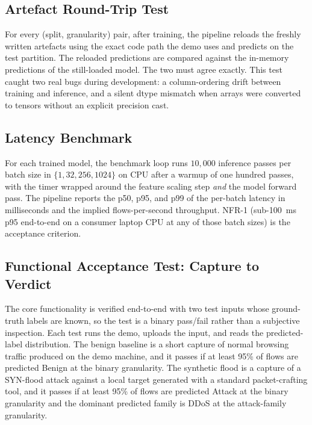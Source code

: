\subsection{Artefact Round-Trip Test}
\label{subsec:roundtrip_test}

\par For every (split, granularity) pair, after training, the pipeline reloads the freshly written artefacts using the exact code path the demo uses and predicts on the test partition. The reloaded predictions are compared against the in-memory predictions of the still-loaded model. The two must agree exactly. This test caught two real bugs during development: a column-ordering drift between training and inference, and a silent dtype mismatch when arrays were converted to tensors without an explicit precision cast.

\subsection{Latency Benchmark}
\label{subsec:latency_benchmark}

\par For each trained model, the benchmark loop runs $10{,}000$ inference passes per batch size in $\{1, 32, 256, 1024\}$ on CPU after a warmup of one hundred passes, with the timer wrapped around the feature scaling step \emph{and} the model forward pass. The pipeline reports the p50, p95, and p99 of the per-batch latency in milliseconds and the implied flows-per-second throughput. NFR-1 (sub-100~ms p95 end-to-end on a consumer laptop CPU at any of those batch sizes) is the acceptance criterion.

\subsection{Functional Acceptance Test: Capture to Verdict}
\label{subsec:f1_functional_test}

\par The core functionality is verified end-to-end with two test inputs whose ground-truth labels are known, so the test is a binary pass/fail rather than a subjective inspection. Each test runs the demo, uploads the input, and reads the predicted-label distribution. The benign baseline is a short capture of normal browsing traffic produced on the demo machine, and it passes if at least 95\% of flows are predicted Benign at the binary granularity. The synthetic flood is a capture of a SYN-flood attack against a local target generated with a standard packet-crafting tool, and it passes if at least 95\% of flows are predicted Attack at the binary granularity and the dominant predicted family is DDoS at the attack-family granularity.


